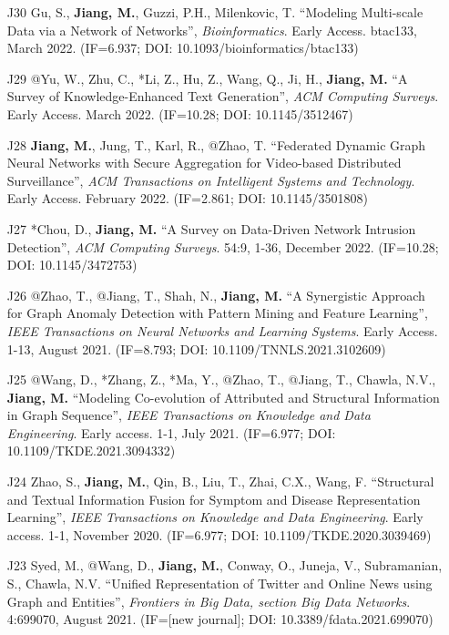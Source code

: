 \documentclass[10pt]{article}
\newenvironment{myindentpar}[1]%
{\begin{list}{}%
         {\setlength{\leftmargin}{#1}}%
         \item[]%
}
{\end{list}}
\newcounter{list}
\begin{document}
\begin{myindentpar}{0.00cm}
\begin{enumerate}[leftmargin=.5cm]
\item[J30] Gu, S., \textbf{Jiang, M.}, Guzzi, P.H., Milenkovic, T. ``Modeling Multi-scale Data via a Network of Networks'', \textit{Bioinformatics}. Early Access. btac133, March 2022. (IF=6.937; DOI: 10.1093/bioinformatics/btac133)

\item[J29] @Yu, W., Zhu, C., *Li, Z., Hu, Z., Wang, Q., Ji, H., \textbf{Jiang, M.} ``A Survey of Knowledge-Enhanced Text Generation'', \textit{ACM Computing Surveys}. Early Access. March 2022. (IF=10.28; DOI: 10.1145/3512467)

\item[J28] \textbf{Jiang, M.}, Jung, T., Karl, R., @Zhao, T. ``Federated Dynamic Graph Neural Networks with Secure Aggregation for Video-based Distributed Surveillance'', \textit{ACM Transactions on Intelligent Systems and Technology}. Early Access. February 2022. (IF=2.861; DOI: 10.1145/3501808)

\item[J27] *Chou, D., \textbf{Jiang, M.} ``A Survey on Data-Driven Network Intrusion Detection'', \textit{ACM Computing Surveys}. 54:9, 1-36, December 2022. (IF=10.28; DOI: 10.1145/3472753)

\item[J26] @Zhao, T., @Jiang, T., Shah, N., \textbf{Jiang, M.} ``A Synergistic Approach for Graph Anomaly Detection with Pattern Mining and Feature Learning'', \textit{IEEE Transactions on Neural Networks and Learning Systems}. Early Access. 1-13, August 2021. (IF=8.793; DOI: 10.1109/TNNLS.2021.3102609)

\item[J25] @Wang, D., *Zhang, Z., *Ma, Y., @Zhao, T., @Jiang, T., Chawla, N.V., \textbf{Jiang, M.} ``Modeling Co-evolution of Attributed and Structural Information in Graph Sequence'', \textit{IEEE Transactions on Knowledge and Data Engineering}. Early access. 1-1, July 2021. (IF=6.977; DOI: 10.1109/TKDE.2021.3094332)

\item[J24] Zhao, S., \textbf{Jiang, M.}, Qin, B., Liu, T., Zhai, C.X., Wang, F. ``Structural and Textual Information Fusion for Symptom and Disease Representation Learning'', \textit{IEEE Transactions on Knowledge and Data Engineering}. Early access. 1-1, November 2020. (IF=6.977; DOI: 10.1109/TKDE.2020.3039469)

\item[J23] Syed, M., @Wang, D., \textbf{Jiang, M.}, Conway, O., Juneja, V., Subramanian, S., Chawla, N.V. ``Unified Representation of Twitter and Online News using Graph and Entities'', \textit{Frontiers in Big Data, section Big Data Networks}. 4:699070, August 2021. (IF=[new journal]; DOI: 10.3389/fdata.2021.699070)


\end{enumerate}
\end{myindentpar}
\end{document}
